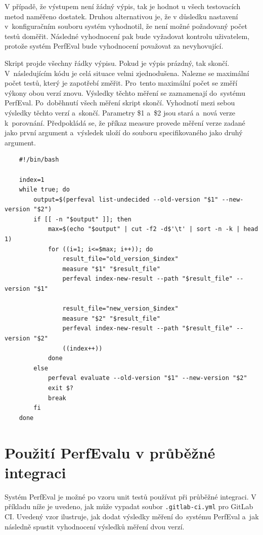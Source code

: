 V případě, že výstupem není žádný výpis, tak je hodnot u všech testovacích metod naměřeno dostatek. Druhou alternativou
je, že v důsledku nastavení v~konfiguračním souboru systém vyhodnotil, že není možné požadovaný
počet testů doměřit. Následné vyhodnocení pak bude vyžadovat kontrolu uživatelem, protože
systém PerfEval bude vyhodnocení považovat za nevyhovující.

Skript projde všechny řádky výpisu. Pokud je výpis prázdný, tak skončí.
V~následujícím kódu je celá situace velmi zjednodušena. Nalezne se maximální počet
testů, který je zapotřebí změřit. Pro~tento maximální počet se změří výkony obou verzí znovu. Výsledky těchto měření
se zaznamenají do~systému PerfEval. Po~doběhnutí všech měření skript skončí. Vyhodnotí mezi sebou výsledky těchto
verzí a~skončí. Parametry \$1 a~\$2 jsou stará a~nová verze k~porovnání. Předpokládá se, že
příkaz measure provede měření verze zadané jako první argument a~výsledek uloží do souboru specifikovaného jako druhý argument.

\begin{lstlisting}
    #!/bin/bash

    index=1
    while true; do
        output=$(perfeval list-undecided --old-version "$1" --new-version "$2")
        if [[ -n "$output" ]]; then
            max=$(echo "$output" | cut -f2 -d$'\t' | sort -n -k | head 1)
            for ((i=1; i<=$max; i++)); do
                result_file="old_version_$index"
                measure "$1" "$result_file"
                perfeval index-new-result --path "$result_file" --version "$1"

                result_file="new_version_$index"
                measure "$2" "$result_file"
                perfeval index-new-result --path "$result_file" --version "$2"
                ((index++))
            done
        else
            perfeval evaluate --old-version "$1" --new-version "$2"
            exit $?
            break
        fi
    done

\end{lstlisting}

\section*{Použití PerfEvalu v průběžné integraci}

Systém PerfEval je možné po vzoru unit testů používat při průběžné integraci.
V příkladu níže je uvedeno, jak může vypadat soubor \texttt{.gitlab-ci.yml} pro GitLab CI.
Uvedený vzor ilustruje, jak dodat výsledky měření do~systému PerfEval a~jak následně
spustit vyhodnocení výsledků měření dvou verzí.

